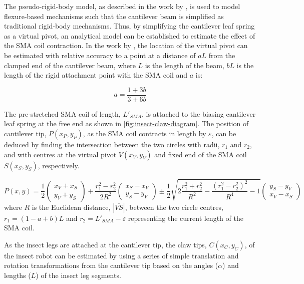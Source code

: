 The pseudo-rigid-body model, as described in the work by \cite{howellHandbookCompliantMechanisms2013}, is used to model flexure-based mechanisms such that the cantilever beam is simplified as traditional rigid-body mechanisms. Thus, by simplifying the cantilever leaf spring as a virtual pivot, an analytical model can be established to estimate the effect of the SMA coil contraction. In the work by \cite{zhangRealPivotStructure2007}, the location of the virtual pivot can be estimated with relative accuracy to a point at a distance of $aL$ from the clamped end of the cantilever beam, where $L$ is the length of the beam, $bL$ is the length of the rigid attachment point with the SMA coil and $a$ is:

\begin{equation}\label{eq:virtual-pivot-a}
a = \frac{1+3b}{3+6b}
\end{equation}

The pre-stretched SMA coil of length, $L'_{SMA}$, is attached to the biasing cantilever leaf spring at the free end as shown in \cref{fig:insect-claw-diagram}. The position of cantilever tip, $P(x_P,y_P)$, as the SMA coil contracts in length by $\varepsilon$, can be deduced by finding the intersection between the two circles with radii, $r_1$ and $r_2$, and with centres at the virtual pivot $V(x_V,y_V)$ and fixed end of the SMA coil $S(x_S,y_S)$, respectively.

\begin{equation}\label{eq:cc-intersect}
  P(x,y) = \frac{1}{2}\begin{pmatrix} x_V+x_S \\ y_V+y_S \end{pmatrix}+\frac{r_1^2-r_2^2}{2R^2}\begin{pmatrix} x_S-x_V \\ y_S-y_V\end{pmatrix}\pm\frac{1}{2}\sqrt{2\frac{r_1^2+r_2^2}{R^2}-\frac{(r_1^2-r_2^2)^2}{R^4}-1}\begin{pmatrix} y_S-y_V \\ x_V-x_S\end{pmatrix}
\end{equation}
where $R$ is the Euclidean distance, $|\overline{VS}|$, between the two circle centres, $r_1 = (1-a+b)L$ and $r_2 = L'_{SMA}-\varepsilon$ representing the current length of the SMA coil.

As the insect legs are attached at the cantilever tip, the claw tips, $C(x_C,y_C)$, of the insect robot can be estimated by using a series of simple translation and rotation transformations from the cantilever tip based on the angles ($\alpha$) and lengths ($L$) of the insect leg segments.

